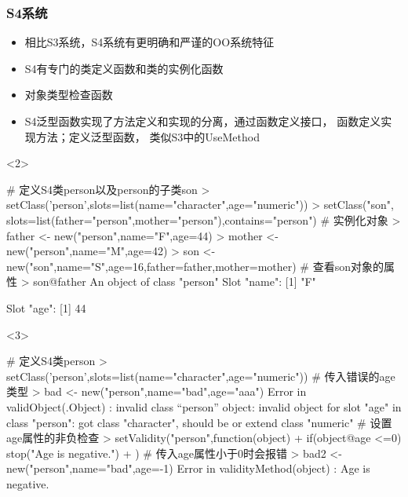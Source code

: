 \subsubsection{S4系统}
\begin{frame}[c,fragile]{\subsecname}{\subsubsecname}
  \begin{itemize}
  \item<1-> 相比S3系统，S4系统有更明确和严谨的OO系统特征
  \item<2-> S4有专门的类定义函数和类的实例化函数
  \item<3-> 对象类型检查函数
  \item<4-> S4泛型函数实现了方法定义和实现的分离，通过函数定义接口，
    函数定义实现方法；定义泛型函数，
类似S3中的UseMethod
  \end{itemize}  

\begin{overlayarea}{\textwidth}{\textheight}
\begin{onlyenv}<2>
\begin{rcode}
# 定义S4类person以及person的子类son
> setClass('person',slots=list(name="character",age="numeric"))
> setClass("son", slots=list(father="person",mother="person"),contains="person")
# 实例化对象
> father <- new("person",name="F",age=44)
> mother <- new("person",name="M",age=42)
> son <- new("son",name="S",age=16,father=father,mother=mother)
# 查看son对象的属性
> son@father
An object of class "person"
Slot "name":
[1] "F"

Slot "age":
[1] 44
\end{rcode}  
\end{onlyenv}

\begin{onlyenv}<3>
\begin{rcode}
# 定义S4类person
> setClass('person',slots=list(name="character",age="numeric"))
# 传入错误的age类型
> bad <- new("person",name="bad",age="aaa")
Error in validObject(.Object) : 
  invalid class “person” object: invalid object for slot "age" in class "person": got class "character", should be or extend class "numeric"
# 设置age属性的非负检查
> setValidity("person",function(object){
+    if(object@age <=0) stop("Age is negative.")
+ })
# 传入age属性小于0时会报错
> bad2 <- new("person",name="bad",age=-1)
Error in validityMethod(object) : Age is negative.
\end{rcode}
\end{onlyenv}


\end{overlayarea}
\end{frame}
